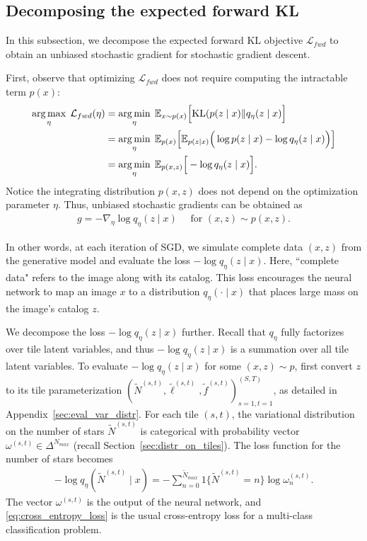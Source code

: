 \subsection{Decomposing the expected forward KL}
\label{sec:sleep_details}
In this subsection, we decompose the expected forward KL objective $\mathcal{L}_{fwd}$ 
to obtain an unbiased stochastic gradient for stochastic gradient descent. 

First, observe that optimizing $\mathcal{L}_{fwd}$ does not require computing the intractable term $p(x)$:
\begin{align}
\operatorname*{arg\,max}_\eta\; \mathcal{L}_{fwd}(\eta)
    & = \operatorname*{arg\,min}_{\eta} \; \mathbb{E}_{x \sim p(x)}\Big[ \mathrm{KL}(p(z \mid x) \| q_\eta(z \mid x)\Big] \\
  &=\operatorname*{arg\,min}_{\eta} \; \mathbb E_{p(x)}\Big[\mathbb E_{p(z \mid x)}\Big(\log p(z \mid x) - \log q_\eta(z \mid x) \Big)\Big]\\
&=\operatorname*{arg\,min}_{\eta} \; \mathbb E_{p(x, z)}\Big[- \log q_\eta(z \mid x) \Big]\label{eq:sleep_loss_simple}.
\end{align}
Notice the integrating distribution $p(x,z)$ does not depend on the optimization parameter $\eta$.
Thus, unbiased stochastic gradients can be obtained as
\begin{align}
    g = -\nabla_\eta \log q_\eta(z \mid x) \quad \text{ for } (x, z)\sim p(x, z).
\end{align}

In other words, at each iteration of SGD, we simulate complete data $(x,z)$ from the generative model and evaluate the loss $-\log q_\eta(z \mid x)$.
Here, ``complete data" refers to the image along with its catalog.
This loss encourages the neural network to map an image $x$ to a distribution $q_{\eta}(\cdot \mid x)$ that places large mass on the image's catalog $z$.

We decompose the loss $-\log q_\eta(z \mid x)$ further.
Recall that $q_\eta$ fully factorizes over tile latent variables, and thus $-\log q_\eta(z \mid x)$ is a summation over all tile latent variables.
To evaluate $-\log q_\eta(z \mid x)$ for some $(x,z)\sim p$, first convert $z$ to its tile parameterization $(\tilde N^{(s,t)}, \tilde \ell^{(s,t)}, \tilde f^{(s,t)})_{s=1,t=1}^{(S,T)}$, as detailed in Appendix~\ref{sec:eval_var_distr}.
For each tile $(s,t)$, the variational distribution on the number of stars $\tilde N^{(s,t)}$ is categorical with probability vector $\omega^{(s,t)}\in\Delta^{N_{max}}$ (recall Section~\ref{sec:distr_on_tiles}).
The loss function for the number of stars becomes
\begin{align}
    - \log q_\eta(\tilde N^{(s,t)} \mid x) = -\sum_{n = 0}^{\tilde N_{max}} 1\{\tilde N^{(s,t)} = n\} \log \omega^{(s,t)}_n.
    \label{eq:cross_entropy_loss}
\end{align}
The vector $\omega^{(s,t)}$ is the output of the neural network, and \eqref{eq:cross_entropy_loss} is the usual cross-entropy loss for a multi-class classification problem.

